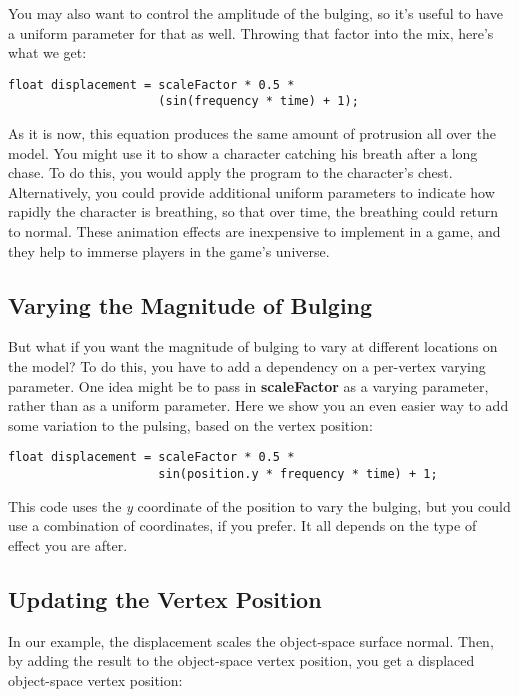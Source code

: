 \documentclass[../main.tex]{subfiles}
\begin{document}
You may also want to control the amplitude of the bulging, so it's useful to have a uniform parameter for that as well. Throwing that factor into the mix, here's what we get:

\FloatBarrier
\begin{lstlisting}
float displacement = scaleFactor * 0.5 *
                     (sin(frequency * time) + 1);
\end{lstlisting}
\FloatBarrier

As it is now, this equation produces the same amount of protrusion all over the model. You might use it to show a character catching his breath after a long chase. To do this, you would apply the program to the character's chest. Alternatively, you could provide additional uniform parameters to indicate how rapidly the character is breathing, so that over time, the breathing could return to normal. These animation effects are inexpensive to implement in a game, and they help to immerse players in the game's universe.

\subsection*{Varying the Magnitude of Bulging}

But what if you want the magnitude of bulging to vary at different locations on the model? To do this, you have to add a dependency on a per-vertex varying parameter. One idea might be to pass in \textbf{scaleFactor} as a varying parameter, rather than as a uniform parameter. Here we show you an even easier way to add some variation to the pulsing, based on the vertex position:

\FloatBarrier
\begin{lstlisting}
float displacement = scaleFactor * 0.5 *
                     sin(position.y * frequency * time) + 1;
\end{lstlisting}
\FloatBarrier

This code uses the \textit{y} coordinate of the position to vary the bulging, but you could use a combination of coordinates, if you prefer. It all depends on the type of effect you are after.

\subsection*{Updating the Vertex Position}

In our example, the displacement scales the object-space surface normal. Then, by adding the result to the object-space vertex position, you get a displaced object-space vertex position:
\end{document}
